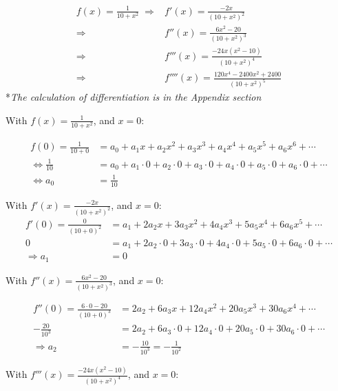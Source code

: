 \documentclass[12pt]{article}
\begin{document}
\begin{align*}
    f(x)=\frac{1}{10+x^2}\;
    \Longrightarrow
    &f'(x)= \frac{-2x}{\left(10+x^2 \right)^2}\\
    \Longrightarrow
    &f''(x)= \frac{6x^2- 20}{\left(10+x^2 \right)^3}\\
    \Longrightarrow
    &f'''(x)= \frac{-24x\left(x^2-10 \right)}{\left(10+x^2 \right)^4}\\
    \Longrightarrow
    &f''''(x)= \frac{120x^4- 2400x^2+ 2400}{\left(10+x^2 \right)^5}
\end{align*}
*\textit{The calculation of differentiation is in the Appendix section}\par

\noindent With $\displaystyle f(x)=\frac{1}{10+x^2}$, and $x=0$:

\begin{align*}
    f(0)=\frac{1}{10+0} &= a_0+ a_1x+ a_2x^2+ a_3x^3+ a_4x^4+ a_5x^5+ a_6x^6+ \cdots\\
    \Longleftrightarrow
    \frac{1}{10} &= a_0+ a_1\cdot 0+ a_2\cdot 0+ a_3\cdot 0+ a_4\cdot 0+ a_5\cdot 0+ a_6\cdot 0+ \cdots\\
    \Longleftrightarrow a_0 &= \frac{1}{10}
\end{align*}


\noindent With $\displaystyle f'(x)= \frac{-2x}{\left(10+x^2 \right)^2}$, and $x=0$:
\begin{align*}
    f'(0)=\frac{0}{\left(10+0\right)^2} &= a_1+ 2a_2x+ 3a_3x^2+ 4a_4x^3+ 5a_5x^4+ 6a_6x^5+ \cdots\\
    0 &= a_1+ 2a_2\cdot 0+ 3a_3\cdot 0+ 4a_4\cdot 0+ 5a_5\cdot 0+ 6a_6\cdot 0+ \cdots\\
    \Longrightarrow a_1 &= 0
\end{align*}



\noindent With $\displaystyle f''(x)= \frac{6x^2- 20}{\left(10+x^2 \right)^3}$, and $x=0$:

\begin{align*}
    f''(0)= \frac{6\cdot 0- 20}{\left(10+ 0 \right)^3}
    &= 2a_2+ 6a_3x+ 12a_4x^2+ 20a_5x^3+ 30a_6x^4+ \cdots\\
    - \frac{20}{10^3} &= 2a_2+ 6a_3\cdot 0+ 12a_4\cdot 0+ 20a_5\cdot 0+ 30a_6\cdot 0+ \cdots\\
    \Longrightarrow a_2 &=- \frac{10}{10^3}=- \frac{1}{10^2}
\end{align*}



\noindent With $\displaystyle f'''(x)= \frac{-24x\left(x^2-10 \right)}{\left(10+x^2 \right)^4}$, and $x=0$:
\end{document}
